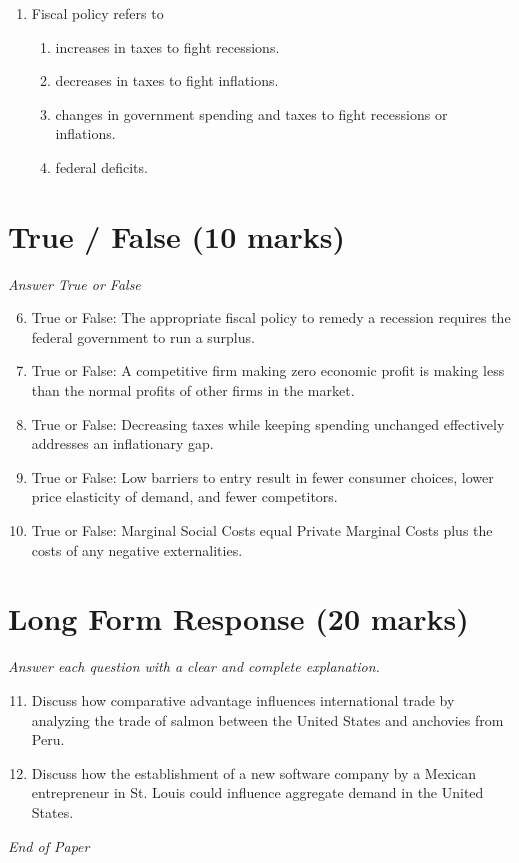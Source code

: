 \documentclass[12pt]{article}
\begin{document}
\begin{enumerate}[label=\arabic*.]
\begin{enumerate}[label=(\alph*)]
    \item AVC and ATC intersect MC at its minimum point.
\end{enumerate}
\item Fiscal policy refers to
\begin{enumerate}[label=(\alph*)]
    \item increases in taxes to fight recessions.
    \item decreases in taxes to fight inflations.
    \item changes in government spending and taxes to fight recessions or inflations.
    \item federal deficits.
\end{enumerate}
\end{enumerate}

\section*{True / False (10 marks)}
\textit{Answer True or False}
\begin{enumerate}[label=\arabic*.]
\setcounter{enumi}{5}
\item True or False: The appropriate fiscal policy to remedy a recession requires the federal government to run a surplus.
\item True or False: A competitive firm making zero economic profit is making less than the normal profits of other firms in the market.
\item True or False: Decreasing taxes while keeping spending unchanged effectively addresses an inflationary gap.
\item True or False: Low barriers to entry result in fewer consumer choices, lower price elasticity of demand, and fewer competitors.
\item True or False: Marginal Social Costs equal Private Marginal Costs plus the costs of any negative externalities.
\end{enumerate}

\section*{Long Form Response (20 marks)}
\textit{Answer each question with a clear and complete explanation.}
\begin{enumerate}[label=\arabic*.]
\setcounter{enumi}{10}
\item Discuss how comparative advantage influences international trade by analyzing the trade of salmon between the United States and anchovies from Peru.
\item Discuss how the establishment of a new software company by a Mexican entrepreneur in St. Louis could influence aggregate demand in the United States.
\end{enumerate}

\vfill
\noindent\textit{End of Paper}
\end{document}
